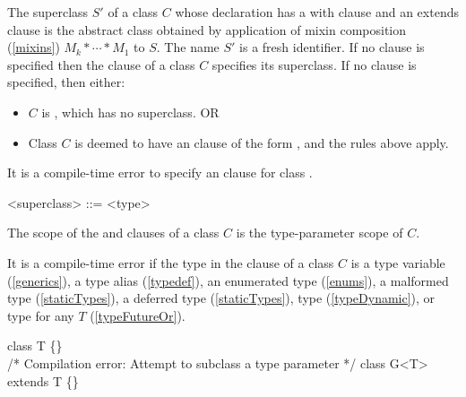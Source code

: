 \documentclass[makeidx]{article}
\begin{document}
\LMHash{}%
The superclass $S'$ of a class $C$ whose declaration has a with clause
and an extends clause
is the abstract class obtained by application of
mixin composition (\ref{mixins}) $M_k* \cdots * M_1$ to $S$.
The name $S'$ is a fresh identifier.
If no \WITH{} clause is specified then the \EXTENDS{} clause of
a class $C$ specifies its superclass.
If no \EXTENDS{} clause is specified, then either:
\begin{itemize}
\item $C$ is , which has no superclass. OR
\item Class $C$ is deemed to have an \EXTENDS{} clause of the form
, and the rules above apply.
\end{itemize}

\LMHash{}%
It is a compile-time error to specify an \EXTENDS{} clause
for class .

\begin{grammar}
<superclass> ::= \EXTENDS{} <type>
\end{grammar}


\LMHash{}%
The scope of the \EXTENDS{} and \WITH{} clauses of a class $C$ is the type-parameter scope of $C$.

\LMHash{}%
It is a compile-time error if the type in the \EXTENDS{} clause of a class $C$ is
a type variable (\ref{generics}), a type alias (\ref{typedef}),
an enumerated type (\ref{enums}), a malformed type (\ref{staticTypes}),
a deferred type (\ref{staticTypes}), type \DYNAMIC{} (\ref{typeDynamic}),
or type  for any $T$ (\ref{typeFutureOr}).


\begin{dartCode}
class T \{\}
\\
/* Compilation error: Attempt to subclass a type parameter */
class G<T> extends T \{\}
\end{dartCode}
\end{document}
